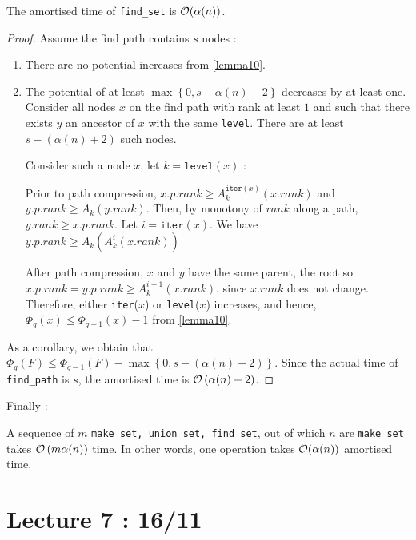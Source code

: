 \documentclass[12pt]{cours}
\begin{document}
\begin{lemma}
    The amortised time of \texttt{find\_set} is $\mathcal{O}(\alpha(n))$.
\end{lemma}
\begin{proof}
    Assume the find path contains $s$ nodes :
    \begin{enumerate}
        \item There are no potential increases from \ref{lemma10}.
        \item The potential of at least $\max \left\{0, s - \alpha(n) - 2\right\}$ decreases by at least one.
              Consider all nodes $x$ on the find path with rank at least $1$ and such that there exists $y$ an ancestor of $x$ with the same \texttt{level}. There are at least $s - \left(\alpha(n) + 2\right)$ such nodes.

              Consider such a node $x$, let $k = \texttt{level}(x)$ :

              Prior to path compression, $x.p.rank \geq A_{k}^{\texttt{iter}(x)}(x.rank)$ and $y.p.rank \geq A_{k}(y.rank)$. Then, by monotony of $rank$ along a path, $y.rank \geq x.p.rank$. Let $i = \texttt{iter}(x)$. We have $y.p.rank \geq A_{k}\left(A_{k}^{i}(x.rank)\right)$

              After path compression, $x$ and $y$ have the same parent, the root so $x.p.rank = y.p.rank \geq A_{k}^{i + 1}(x.rank)$. since $x.rank$ does not change. Therefore, either \texttt{iter}($x$) or \texttt{level}($x$) increases, and hence, $\Phi_{q}(x) \leq \Phi_{q - 1}(x) - 1$ from \ref{lemma10}.
    \end{enumerate}
    As a corollary, we obtain that $\Phi_{q}(F) \leq \Phi_{q - 1}(F) - \max \left\{0, s - \left(\alpha(n) + 2\right)\right\}$. Since the actual time of \texttt{find\_path} is $s$, the amortised time is $\mathcal{O}\left(\alpha(n) + 2\right)$.
\end{proof}

Finally :

\begin{theorem}
    A sequence of $m$ \texttt{make\_set, union\_set, find\_set}, out of which $n$ are \texttt{make\_set} takes $\mathcal{O}\left(m \alpha(n)\right)$ time. In other words, one operation takes $\mathcal{O}(\alpha(n))$ amortised time.
\end{theorem}

\part[DFS-Matroids-MST]{Lecture 7 : 16/11}  %
\localtableofcontents
\end{document}
